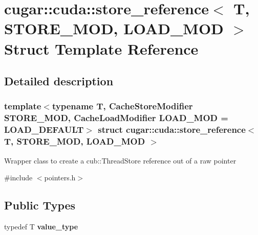 \hypertarget{structcugar_1_1cuda_1_1store__reference}{}\section{cugar\+:\+:cuda\+:\+:store\+\_\+reference$<$ T, S\+T\+O\+R\+E\+\_\+\+M\+OD, L\+O\+A\+D\+\_\+\+M\+OD $>$ Struct Template Reference}
\label{structcugar_1_1cuda_1_1store__reference}


\subsection{Detailed description}
\subsubsection*{template$<$typename T, Cache\+Store\+Modifier S\+T\+O\+R\+E\+\_\+\+M\+OD, Cache\+Load\+Modifier L\+O\+A\+D\+\_\+\+M\+OD = L\+O\+A\+D\+\_\+\+D\+E\+F\+A\+U\+LT$>$\newline
struct cugar\+::cuda\+::store\+\_\+reference$<$ T, S\+T\+O\+R\+E\+\_\+\+M\+O\+D, L\+O\+A\+D\+\_\+\+M\+O\+D $>$}

Wrapper class to create a cub\+::\+Thread\+Store reference out of a raw pointer 

{\ttfamily \#include $<$pointers.\+h$>$}

\subsection*{Public Types}
\begin{DoxyCompactItemize}
\item 
\mbox{\label{structcugar_1_1cuda_1_1store__reference_aacba3511df1df36953d5320c24dadee8}} 
typedef T {\bfseries value\+\_\+type}
\end{DoxyCompactItemize}
